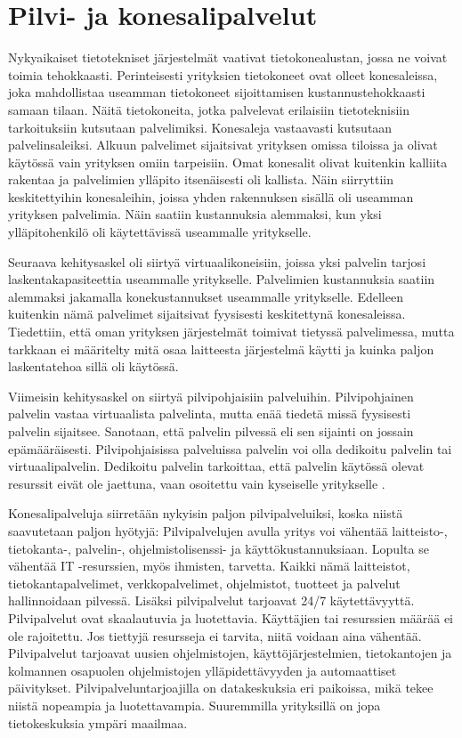 \chapter{Pilvi- ja konesalipalvelut\label{konesalipalvelut}}
Nykyaikaiset tietotekniset järjestelmät vaativat tietokonealustan, jossa ne voivat toimia tehokkaasti. Perinteisesti yrityksien tietokoneet ovat olleet konesaleissa, joka mahdollistaa useamman tietokoneet sijoittamisen kustannustehokkaasti samaan tilaan. Näitä tietokoneita, jotka palvelevat erilaisiin tietoteknisiin tarkoituksiin kutsutaan palvelimiksi. \citep{server_computing} Konesaleja vastaavasti kutsutaan palvelinsaleiksi. Alkuun palvelimet sijaitsivat yrityksen omissa tiloissa ja olivat käytössä vain yrityksen omiin tarpeisiin. Omat konesalit olivat kuitenkin kalliita rakentaa ja palvelimien ylläpito itsenäisesti oli kallista. Näin siirryttiin keskitettyihin konesaleihin, joissa yhden rakennuksen sisällä oli useamman yrityksen palvelimia. Näin saatiin kustannuksia alemmaksi, kun yksi ylläpitohenkilö oli käytettävissä useammalle yritykselle. \citep{server_room}

Seuraava kehitysaskel oli siirtyä virtuaalikoneisiin, joissa yksi palvelin tarjosi laskentakapasiteettia useammalle yritykselle. Palvelimien kustannuksia saatiin alemmaksi jakamalla konekustannukset useammalle yritykselle. Edelleen kuitenkin nämä palvelimet sijaitsivat fyysisesti keskitettynä konesaleissa. Tiedettiin, että oman yrityksen järjestelmät toimivat tietyssä palvelimessa, mutta tarkkaan ei määritelty mitä osaa laitteesta järjestelmä käytti ja kuinka paljon laskentatehoa sillä oli käytössä.\citep{virtual_server}

Viimeisin kehitysaskel on siirtyä pilvipohjaisiin palveluihin. Pilvipohjainen palvelin vastaa virtuaalista palvelinta, mutta enää tiedetä missä fyysisesti palvelin sijaitsee. \citep{cloud_computing} Sanotaan, että palvelin pilvessä eli sen sijainti on jossain epämääräisesti. Pilvipohjaisissa palveluissa palvelin voi olla dedikoitu palvelin tai virtuaalipalvelin. Dedikoitu palvelin tarkoittaa, että palvelin käytössä olevat resurssit eivät ole jaettuna, vaan osoitettu vain kyseiselle yritykselle \citep{dedicated_hosting}.

Konesalipalveluja siirretään nykyisin paljon pilvipalveluiksi, koska niistä saavutetaan paljon hyötyjä: Pilvipalvelujen avulla yritys voi vähentää laitteisto-, tietokanta-, palvelin-, ohjelmistolisenssi- ja käyttökustannuksiaan. Lopulta se vähentää IT -resurssien, myös ihmisten, tarvetta. Kaikki nämä laitteistot, tietokantapalvelimet, verkkopalvelimet, ohjelmistot, tuotteet ja palvelut hallinnoidaan pilvessä. Lisäksi pilvipalvelut tarjoavat 24/7 käytettävyyttä. Pilvipalvelut ovat skaalautuvia ja luotettavia. Käyttäjien tai resurssien määrää ei ole rajoitettu. Jos tiettyjä resursseja ei tarvita, niitä voidaan aina vähentää. Pilvipalvelut tarjoavat uusien ohjelmistojen, käyttöjärjestelmien, tietokantojen ja kolmannen osapuolen ohjelmistojen ylläpidettävyyden ja automaattiset päivitykset. Pilvipalveluntarjoajilla on datakeskuksia eri paikoissa, mikä tekee niistä nopeampia ja luotettavampia. Suuremmilla yrityksillä on jopa tietokeskuksia ympäri maailmaa. \citep{top_cloud}

